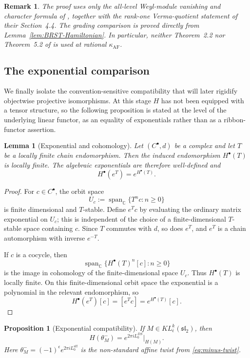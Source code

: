 \documentclass[12pt,leqno]{amsart}
\numberwithin{equation}{section}
\newtheorem{lem}[thm]{Lemma}
\newtheorem{prop}[thm]{Proposition}
\newtheorem{rmk}[thm]{Remark}
\newcommand{\KL}{KL}
\def\C{\mathbb{C}}
\begin{document}
\begin{rmk}\label{rmk:Weyl-reduction-scope}
The proof uses only the all-level Weyl-module vanishing and character formula
of \cite{ArakawaFrenkel}, together with the rank-one Verma-quotient statement
of their Section~4.4.  The grading comparison is proved directly from
Lemma~\ref{lem:BRST-Hamiltonian}.  In particular, neither Theorem~2.2
nor Theorem~5.2 of \cite{ArakawaFrenkel} is used at rational
$\kappa_{\mathrm{AF}}$.
\end{rmk}

\subsection{The exponential comparison}

We finally isolate the convention-sensitive compatibility that will later
rigidify objectwise projective isomorphisms.  At this stage $H$ has not
been equipped with a tensor structure, so the following proposition is stated at the level of the underlying
linear functor, as an equality of exponentials rather than as a
ribbon-functor assertion.

\begin{lem}[Exponential and cohomology]\label{lem:exponential-cohomology}
Let $(C^\bullet,d)$ be a complex and let $T$ be a locally finite chain
endomorphism.  Then the induced endomorphism $H^\bullet(T)$ is locally
finite.  The algebraic exponentials are therefore well-defined and
\[
 H^\bullet(e^T)=e^{H^\bullet(T)}.
\]
\end{lem}

\begin{proof}
For $c\in C^\bullet$, the orbit space
\[
 U_c:=\operatorname{span}_{\C}\{T^nc:n\ge0\}
\]
is finite dimensional and $T$-stable.  Define $e^Tc$ by evaluating the
ordinary matrix exponential on $U_c$; this is independent of the choice
of a finite-dimensional $T$-stable space containing $c$.  Since $T$
commutes with $d$, so does $e^T$, and $e^T$ is a chain automorphism with
inverse $e^{-T}$.

If $c$ is a cocycle, then
\[
 \operatorname{span}_{\C}\{H^\bullet(T)^n[c]:n\ge0\}
\]
is the image in cohomology of the finite-dimensional space $U_c$.
Thus $H^\bullet(T)$ is locally finite.  On this finite-dimensional orbit
space the exponential is a polynomial in the relevant endomorphism, so
\[
 H^\bullet(e^T)[c]=[e^Tc]=e^{H^\bullet(T)}[c].
\]
\end{proof}

\begin{prop}[Exponential compatibility]\label{prop:H-twist}
If $M\in\KL^k_{\bar\epsilon}(\mathfrak{sl}_2)$, then
\begin{equation}\label{eq:H-exponential-compatibility}
 H(\theta^-_M)=e^{2\pi iL^{DS}_0}\big|_{H(M)}.
\end{equation}
Here $\theta^-_M=(-1)^\epsilon e^{2\pi iL^{\mathrm{aff}}_0}$ is the
non-standard affine twist from \eqref{eq:minus-twist}.
\end{prop}
\end{document}

